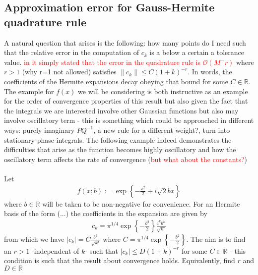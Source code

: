 \documentclass[12pt]{article}
\numberwithin{equation}{section}
\begin{document}
\subsection{Approximation error for Gauss-Hermite quadrature rule}
A natural question that arises is the following: how many points do I need such 
that the relative error in the computation of $c_k$ is a below a certain a 
tolerance value. \textcolor{red}{in \cite{lubichQuantumClassicalMolecular2008} 
it simply stated that the error in the quadrature rule is $\mathcal{O}(M^-r)$} where 
$r > 1$ (why r=1 not allowed) satisfies $\|c_k\| \leq C (1+k)^{-r}$. In words, 
the coefficients of the Hermite expansions decay obeying that bound for some $C \in \mathbb{R}$.
\\
The example for $f(x)$ we will be considering is both instructive as an example 
for the order of convergence properties of this result but also given the fact that 
the integrals we are interested involve other Gaussian functions but also 
may involve oscillatory term - this is something which could be approached in 
different ways: purely imaginary $PQ^{-1}$, a new rule for a different weight?, 
turn into stationary phase-integrals. The following example indeed demonstrates the 
difficulties that arise as the function becomes highly oscillatory and how the 
oscillatory term affects the rate of convergence (\textcolor{red}{but what about the 
constants?})
\\ 
\\
Let 
\begin{equation}
  \begin{split}
    f(x; b) := 
    \exp
    \left\{ 
      - \frac{x^2}{2}
      +
    i \sqrt{2}b x
    \right\}
  \end{split}
\end{equation}
where $b \in \mathbb{R}$ will be taken to be non-negative for convenience.
For an Hermite basis of the form (...) the coefficients in the expansion are given by 
\begin{equation}
  \begin{split}
  c_k = \pi^{1/4} 
  \exp\left\{-\frac{b^2}{2}\right\}
  \frac{i^k b^k}{\sqrt{k!}}
  \end{split}
\end{equation}
from which we have $|c_k| = C 
  \frac{b^k}{\sqrt{k!}}$ where $C = \pi^{1/4} \exp\left\{-\frac{b^2}{2}\right\}$. 
  The aim is to find an $r > 1$ -independent of $k$- such that 
  $|c_k| \leq D (1+k)^{-r}$ for some $C \in \mathbb{R}$ - this condition is such that 
  the result about convergence holds. Equivalently, find $r$ and $D \in \mathbb{R}$
\end{document}
